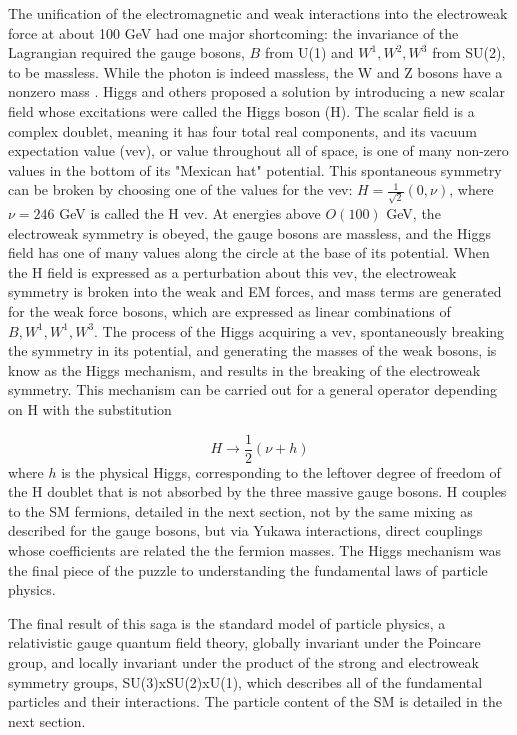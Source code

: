 \indent The unification of the electromagnetic and weak interactions into the electroweak force at about 100 GeV had one major shortcoming: the invariance of the Lagrangian required the gauge bosons, $B$ from U(1) and $W^1, W^2, W^3$ from SU(2), to be massless. While the photon is indeed massless, the W and Z bosons have a nonzero mass \cite{}. Higgs and others \cite{PhysRevLett.13.321, Higgs:1964ia, PhysRevLett.13.508, PhysRevLett.13.585, PhysRev.145.1156, Kibble:1967sv} proposed a solution by introducing a new scalar field whose excitations were called the Higgs boson (H). The scalar field is a complex doublet, meaning it has four total real components, and its vacuum expectation value (vev), or value throughout all of space, is one of many non-zero values in the bottom of its "Mexican hat" potential. This spontaneous symmetry can be broken by choosing one of the values for the vev: $H = \frac{1}{\sqrt{2}} (0, \nu)$, where $\nu=246$ GeV is called the H vev. At energies above $O(100)$ GeV, the electroweak symmetry is obeyed, the gauge bosons are massless, and the Higgs field has one of many values along the circle at the base of its potential. When the H field is expressed as a perturbation about this vev, the electroweak symmetry is broken into the weak and EM forces, and mass terms are generated for the weak force bosons, which are expressed as linear combinations of $B, W^1, W^1, W^3$. The process of the Higgs acquiring a vev, spontaneously breaking the symmetry in its potential, and generating the masses of the weak bosons, is know as the Higgs mechanism, and results in the breaking of the electroweak symmetry. This mechanism can be carried out for a general operator depending on H with the substitution

\begin{equation}
H \rightarrow \frac{1}{2} (\nu + h)
\end{equation}
where $h$ is the physical Higgs, corresponding to the leftover degree of freedom of the H doublet that is not absorbed by the three massive gauge bosons. H couples to the SM fermions, detailed in the next section, not by the same mixing as described for the gauge bosons, but via Yukawa interactions, direct couplings whose coefficients are related the the fermion masses. The Higgs mechanism was the final piece of the puzzle to understanding the fundamental laws of particle physics.
 
\indent The final result of this saga is the standard model of particle physics, a relativistic gauge quantum field theory, globally invariant under the Poincare group, and locally invariant under the product of the strong and electroweak symmetry groups, SU(3)xSU(2)xU(1), which describes all of the fundamental particles and their interactions. The particle content of the SM is detailed in the next section.

